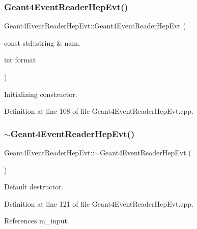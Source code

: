 \subsubsection{\texorpdfstring{Geant4\+Event\+Reader\+Hep\+Evt()}{Geant4EventReaderHepEvt()}}
{\footnotesize\ttfamily Geant4\+Event\+Reader\+Hep\+Evt\+::\+Geant4\+Event\+Reader\+Hep\+Evt (\begin{DoxyParamCaption}\item[{const std\+::string \&}]{nam,  }\item[{int}]{format }\end{DoxyParamCaption})\hspace{0.3cm}{\ttfamily [explicit]}}



Initializing constructor. 



Definition at line 108 of file Geant4\+Event\+Reader\+Hep\+Evt.\+cpp.

\hypertarget{class_d_d4hep_1_1_simulation_1_1_geant4_event_reader_hep_evt_a76273635b29ccc9d9977327da6d6d32d}{}\label{class_d_d4hep_1_1_simulation_1_1_geant4_event_reader_hep_evt_a76273635b29ccc9d9977327da6d6d32d} 
\subsubsection{\texorpdfstring{$\sim$\+Geant4\+Event\+Reader\+Hep\+Evt()}{~Geant4EventReaderHepEvt()}}
{\footnotesize\ttfamily Geant4\+Event\+Reader\+Hep\+Evt\+::$\sim$\+Geant4\+Event\+Reader\+Hep\+Evt (\begin{DoxyParamCaption}{ }\end{DoxyParamCaption})\hspace{0.3cm}{\ttfamily [virtual]}}



Default destructor. 



Definition at line 121 of file Geant4\+Event\+Reader\+Hep\+Evt.\+cpp.



References m\+\_\+input.



